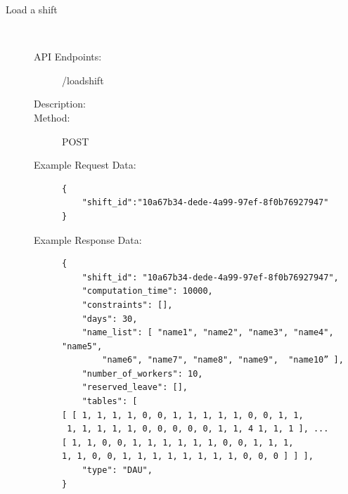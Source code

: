 \documentclass[11pt, oneside]{article}   	%
\begin{document}
\begin{description}
\item[Load a shift]
\
\begin{description}
\item[API Endpoints:] /loadshift
\item[Description:]
\item[Method:] POST
\item[Example Request Data:]
\begin{verbatim}
{
    "shift_id":"10a67b34-dede-4a99-97ef-8f0b76927947"
}
\end{verbatim}
\item[Example Response Data:]
\begin{verbatim}
{
    "shift_id": "10a67b34-dede-4a99-97ef-8f0b76927947",
    "computation_time": 10000,
    "constraints": [],
    "days": 30,
    "name_list": [ "name1", "name2", "name3", "name4", "name5",
        "name6", "name7", "name8", "name9",  "name10” ],
    "number_of_workers": 10,
    "reserved_leave": [],
    "tables": [
[ [ 1, 1, 1, 1, 0, 0, 1, 1, 1, 1, 1, 0, 0, 1, 1,
 1, 1, 1, 1, 1, 0, 0, 0, 0, 0, 1, 1, 4 1, 1, 1 ], ...
[ 1, 1, 0, 0, 1, 1, 1, 1, 1, 1, 0, 0, 1, 1, 1, 
1, 1, 0, 0, 1, 1, 1, 1, 1, 1, 1, 1, 0, 0, 0 ] ] ],
    "type": "DAU",
}
\end{verbatim}
\end{description}



\end{description}
\end{document}

